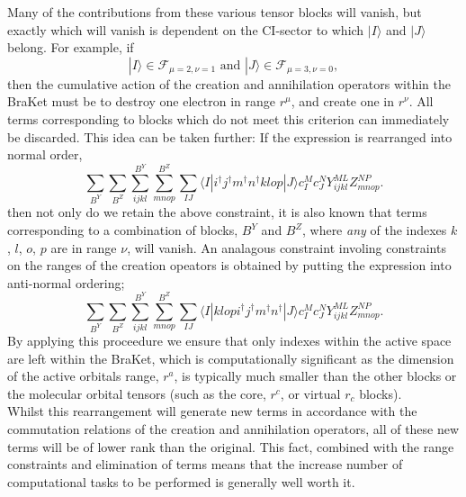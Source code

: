 \documentclass[12pt]{article}
\begin{document}
\noindent Many of the contributions from these various tensor blocks will
vanish, but exactly which will vanish is dependent on the CI-sector to which
$|I \rangle$ and $|J \rangle$ belong. For example, if 
\begin{equation*}
|I\rangle \in \mathcal{F}_{\mu = 2,\nu = 1} \text{ \ \ \ \ and  \ \ \ \ } |J\rangle \in \mathcal{F}_{\mu = 3,\nu = 0},
\end{equation*}
then the cumulative action of the creation and annihilation operators within
the BraKet must be to destroy one electron in range $r^{\mu}$, and create one
in $r^{\nu}$. All terms corresponding to blocks which do not meet this
criterion can immediately be discarded. This idea can be taken further: If the
expression is rearranged into normal order,
\begin{equation}
\sum_{B^{Y}}\sum_{B^{Z}}
\sum^{B^{Y}}_{ijkl}\sum^{B^{Z}}_{mnop} \sum_{IJ} \langle I | i^{\dagger}j^{\dagger}m^{\dagger}n^{\dagger}klop | J \rangle c^{M}_{I} c_{J}^{N} Y^{ML}_{ijkl}Z^{NP}_{mnop}.
\label{eqn:basic_term_nordered}
\end{equation}
\noindent then not only do we retain the above constraint, it is also known
that terms corresponding to a combination of blocks, $B^{Y}$ and $B^{Z}$, where
\emph{any} of the indexes $k$, $l$, $o$, $p$ are in range $\nu$, will vanish.
An analagous constraint involing constraints on the ranges of the creation 
opeators is obtained by putting the expression into anti-normal ordering;
\begin{equation}
\sum_{B^{Y}}\sum_{B^{Z}}
\sum^{B^{Y}}_{ijkl}\sum^{B^{Z}}_{mnop} \sum_{IJ} \langle I |klop i^{\dagger}j^{\dagger}m^{\dagger}n^{\dagger} | J \rangle c^{M}_{I} c_{J}^{N} Y^{ML}_{ijkl}Z^{NP}_{mnop}.
\label{eqn:basic_term_anordered}
\end{equation}
\noindent By applying this proceedure we ensure that only indexes within the
active space are left within the BraKet, which is computationally significant
as the dimension of the active orbitals range, $r^{a}$, is typically much
smaller than the other blocks or the molecular orbital tensors (such as the
core, $r^{c}$, or virtual $r_{c}$ blocks).\\

\noindent Whilst this rearrangement will generate new terms in accordance with
the commutation relations of the creation and annihilation operators, all of
these new terms will be of lower rank than the original.  This fact, combined
with the range constraints and elimination of terms means that the increase
number of computational tasks to be performed is generally well worth it.\\  
\end{document}
